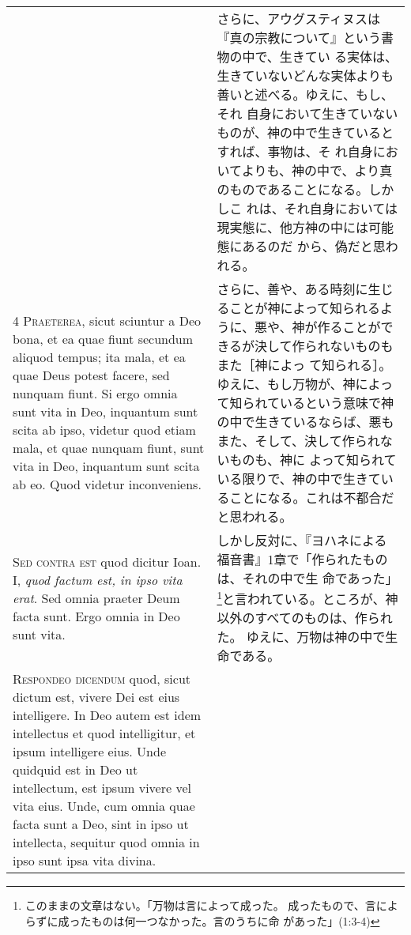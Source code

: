 \documentclass[10pt]{jsarticle} %
\begin{document}
\begin{longtable}{p{21em}p{21em}}
&


さらに、アウグスティヌスは『真の宗教について』という書物の中で、生きてい
 る実体は、生きていないどんな実体よりも善いと述べる。ゆえに、もし、それ
 自身において生きていないものが、神の中で生きているとすれば、事物は、そ
 れ自身においてよりも、神の中で、より真のものであることになる。しかしこ
 れは、それ自身においては現実態に、他方神の中には可能態にあるのだ
 から、偽だと思われる。

\\




{\scshape 4 Praeterea}, sicut sciuntur a Deo bona, et ea
 quae fiunt secundum aliquod tempus; ita mala, et ea quae Deus potest
 facere, sed nunquam fiunt. Si ergo omnia sunt vita in Deo, inquantum
 sunt scita ab ipso, videtur quod etiam mala, et quae nunquam fiunt,
 sunt vita in Deo, inquantum sunt scita ab eo. Quod videtur
 inconveniens.


&


さらに、善や、ある時刻に生じることが神によって知られるよ
 うに、悪や、神が作ることができるが決して作られないものもまた［神によっ
 て知られる］。ゆえに、もし万物が、神によって知られているという意味で神
 の中で生きているならば、悪もまた、そして、決して作られないものも、神に
 よって知られている限りで、神の中で生きていることになる。これは不都合だ
 と思われる。

\\




{\scshape  Sed contra est} quod dicitur Ioan. I, {\itshape quod
 factum est, in ipso vita erat}. Sed omnia praeter Deum facta sunt. Ergo
 omnia in Deo sunt vita.


&

しかし反対に、『ヨハネによる福音書』1章で「作られたものは、それの中で生
 命であった」\footnote{このままの文章はない。「万物は言によって成った。
 成ったもので、言によらずに成ったものは何一つなかった。言のうちに命
 があった」(1:3-4)}と言われている。ところが、神以外のすべてのものは、作られた。
 ゆえに、万物は神の中で生命である。

\\




{\scshape Respondeo dicendum} quod, sicut dictum est,
 vivere Dei est eius intelligere. In Deo autem est idem intellectus et
 quod intelligitur, et ipsum intelligere eius. Unde quidquid est in Deo
 ut intellectum, est ipsum vivere vel vita eius. Unde, cum omnia quae
 facta sunt a Deo, sint in ipso ut intellecta, sequitur quod omnia in
 ipso sunt ipsa vita divina.



\end{longtable}
\end{document}
